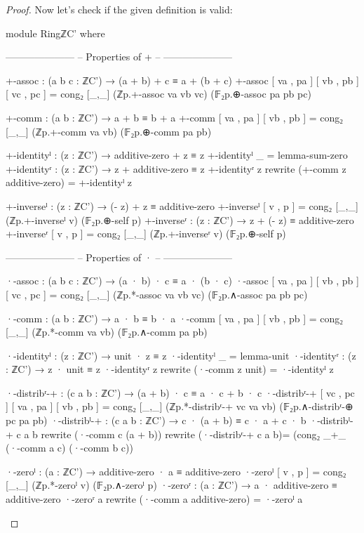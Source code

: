 \documentclass[a4paper]{report}
\theoremstyle{definition}
\theoremstyle{lemma}
\theoremstyle{theorem}
\begin{document}
\begin{proof}
  Now let's check if the given definition is valid:
  \begin{code}
module RingℤC' where

  ---------------------
  -- Properties of + --
  ---------------------

  +-assoc : (a b c : ℤC') → (a + b) + c ≡ a + (b + c)
  +-assoc [ va , pa ] [ vb , pb ] [ vc , pc ] =
    cong₂ [_,_] (ℤp.+-assoc va vb vc) (𝔽₂p.⊕-assoc pa pb pc)

  +-comm : (a b : ℤC') → a + b ≡ b + a
  +-comm [ va , pa ] [ vb , pb ] =
    cong₂ [_,_] (ℤp.+-comm va vb) (𝔽₂p.⊕-comm pa pb)

  +-identityˡ : (z : ℤC') → additive-zero + z ≡ z
  +-identityˡ _ = lemma-sum-zero
  +-identityʳ : (z : ℤC') → z + additive-zero ≡ z
  +-identityʳ z rewrite (+-comm z additive-zero) = +-identityˡ z

  +-inverseˡ : (z : ℤC') → (- z) + z ≡ additive-zero
  +-inverseˡ [ v , p ] = cong₂ [_,_] (ℤp.+-inverseˡ v) (𝔽₂p.⊕-self p)
  +-inverseʳ : (z : ℤC') → z + (- z) ≡ additive-zero
  +-inverseʳ [ v , p ] = cong₂ [_,_] (ℤp.+-inverseʳ v) (𝔽₂p.⊕-self p)

  ---------------------
  -- Properties of · --
  ---------------------

  ·-assoc : (a b c : ℤC') → (a · b) · c ≡ a · (b · c)
  ·-assoc [ va , pa ] [ vb , pb ] [ vc , pc ] =
    cong₂ [_,_] (ℤp.*-assoc va vb vc) (𝔽₂p.∧-assoc pa pb pc)

  ·-comm : (a b : ℤC') → a · b ≡ b · a
  ·-comm [ va , pa ] [ vb , pb ] =
    cong₂ [_,_] (ℤp.*-comm va vb) (𝔽₂p.∧-comm pa pb)

  ·-identityˡ : (z : ℤC') → unit · z ≡ z
  ·-identityˡ _ = lemma-unit
  ·-identityʳ : (z : ℤC') → z · unit ≡ z
  ·-identityʳ z rewrite (·-comm z unit) = ·-identityˡ z

  ·-distribʳ-+ : (c a b : ℤC') → (a + b) · c ≡ a · c + b · c
  ·-distribʳ-+ [ vc , pc ] [ va , pa ] [ vb , pb ] =
    cong₂ [_,_] (ℤp.*-distribʳ-+ vc va vb) (𝔽₂p.∧-distribʳ-⊕ pc pa pb)
  ·-distribˡ-+ : (c a b : ℤC') → c · (a + b) ≡ c · a + c · b
  ·-distribˡ-+ c a b rewrite (·-comm c (a + b)) rewrite  (·-distribʳ-+ c a b)=
    (cong₂ _+_  (·-comm a c) (·-comm b c))

  ·-zeroˡ : (a : ℤC') → additive-zero · a ≡ additive-zero
  ·-zeroˡ [ v , p ] = cong₂ [_,_] (ℤp.*-zeroˡ v)  (𝔽₂p.∧-zeroˡ p)
  ·-zeroʳ : (a : ℤC') → a · additive-zero ≡ additive-zero
  ·-zeroʳ a rewrite (·-comm a additive-zero) = ·-zeroˡ a


\end{code}
\end{proof}
\end{document}
